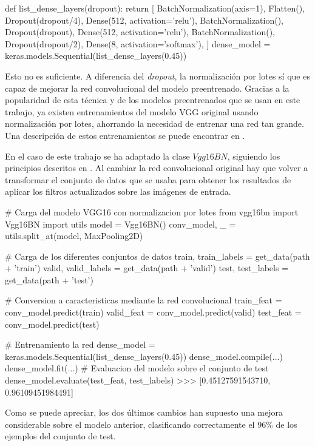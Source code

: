 \begin{python}
def list_dense_layers(dropout):
    return [
        BatchNormalization(axis=1),
        Flatten(),
        Dropout(dropout/4),
        Dense(512, activation='relu'),
        BatchNormalization(),
        Dropout(dropout),
        Dense(512, activation='relu'),
        BatchNormalization(),
        Dropout(dropout/2),
        Dense(8, activation='softmax'),
    ]
dense_model = keras.models.Sequential(list_dense_layers(0.45))
\end{python}

Esto no es suficiente. A diferencia del \textit{dropout}, la normalización por
lotes sí que es capaz de mejorar la red convolucional del modelo preentrenado.
Gracias a la popularidad de esta técnica y de los modelos preentrenados que se
usan en este trabajo, ya existen entrenamientos del modelo VGG original usando
normalización por lotes, ahorrando la necesidad de entrenar una red tan grande.
Una descripción de estos entrenamientos se puede encontrar en
\parencite{pretrained_with_bn}.

En el caso de este trabajo se ha adaptado la clase $Vgg16BN$, siguiendo
los principios descritos en \parencite{fastai}. Al cambiar la red convolucional
original hay que volver a transformar el conjunto de datos que se usaba para
obtener los resultados de aplicar los filtros actualizados sobre las imágenes
de entrada.

\begin{python}
# Carga del modelo VGG16 con normalizacion por lotes
from vgg16bn import Vgg16BN
import utils
model = Vgg16BN()
conv_model, _ = utils.split_at(model, MaxPooling2D)

# Carga de los diferentes conjuntos de datos
train, train_labels = get_data(path + 'train')
valid, valid_labels = get_data(path + 'valid')
test, test_labels = get_data(path + 'test')

# Conversion a caracteristicas mediante la red convolucional
train_feat = conv_model.predict(train)
valid_feat = conv_model.predict(valid)
test_feat = conv_model.predict(test)

# Entrenamiento la red
dense_model = keras.models.Sequential(list_dense_layers(0.45))
dense_model.compile(...)
dense_model.fit(...)
# Evaluacion del modelo sobre el conjunto de test
dense_model.evaluate(test_feat, test_labels)
>>> [0.45127591543710, 0.96109451984491]
\end{python}

Como se puede apreciar, los dos últimos cambios han supuesto una mejora considerable sobre el modelo anterior, clasificando correctamente el 96\% de los ejemplos del conjunto de test.

